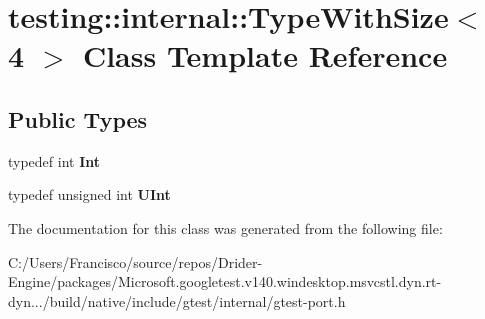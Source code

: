 \hypertarget{classtesting_1_1internal_1_1_type_with_size_3_014_01_4}{}\section{testing\+:\+:internal\+:\+:Type\+With\+Size$<$ 4 $>$ Class Template Reference}
\label{classtesting_1_1internal_1_1_type_with_size_3_014_01_4}
\subsection*{Public Types}
\begin{DoxyCompactItemize}
\item 
\mbox{\label{classtesting_1_1internal_1_1_type_with_size_3_014_01_4_a80351860c00ed665e73f952143f4484a}} 
typedef int {\bfseries Int}
\item 
\mbox{\label{classtesting_1_1internal_1_1_type_with_size_3_014_01_4_a7d559570f830bf35d095eeb94d98de58}} 
typedef unsigned int {\bfseries U\+Int}
\end{DoxyCompactItemize}


The documentation for this class was generated from the following file\+:\begin{DoxyCompactItemize}
\item 
C\+:/\+Users/\+Francisco/source/repos/\+Drider-\/\+Engine/packages/\+Microsoft.\+googletest.\+v140.\+windesktop.\+msvcstl.\+dyn.\+rt-\/dyn.../build/native/include/gtest/internal/gtest-\/port.\+h\end{DoxyCompactItemize}
